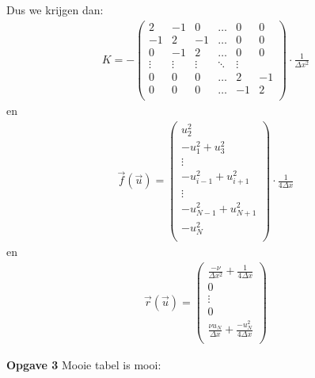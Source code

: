 \documentclass{article}
\begin{document}
Dus we krijgen dan:
\begin{align*}
K = -\begin{pmatrix}
2 & -1 & 0 & \hdots & 0 & 0\\
-1 & 2 & -1 & \hdots & 0 & 0\\
0 & -1 & 2 & \hdots & 0 & 0\\
\vdots & \vdots & \vdots & \ddots & \vdots\\
0 & 0 & 0 & \hdots & 2 & -1\\
0 & 0 & 0 & \hdots & -1 & 2\\
\end{pmatrix}\cdot\frac{1}{\Delta x^2}
\end{align*}
en
\begin{align*}
\vec{f}(\vec{u}) = 
\begin{pmatrix}
u_2^2\\
-u_1^2 + u_3^2\\
\vdots\\
-u_{i-1}^2+u_{i+1}^2\\
\vdots\\
-u_{N-1}^2+u_{N+1}^2\\
-u_N^2\\
\end{pmatrix}
\cdot\frac{1}{4\Delta x}
\end{align*}
en
\begin{align*}
\vec{r}(\vec{u}) = 
\begin{pmatrix}
\frac{-\nu}{\Delta x^2} + \frac{1}{4\Delta x}\\
0\\
\vdots\\
0\\
\frac{\nu u_N}{\Delta x} + \frac{-u_N^2}{4\Delta x}\\
\end{pmatrix}
\end{align*}

\textbf{Opgave 3}
Mooie tabel is mooi:
\end{document}

